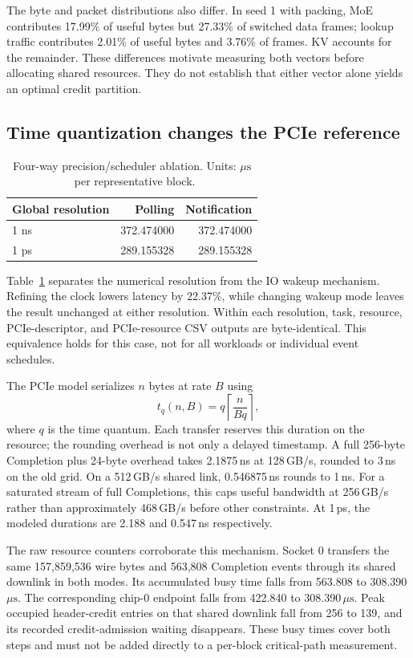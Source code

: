 \documentclass[conference]{IEEEtran}
\newcommand{\us}{\ensuremath{\mu\mathrm{s}}}
\begin{document}
The byte and packet distributions also differ. In seed 1 with packing, MoE contributes 17.99\% of useful bytes but 27.33\% of switched data frames; lookup traffic contributes 2.01\% of useful bytes and 3.76\% of frames. KV accounts for the remainder. These differences motivate measuring both vectors before allocating shared resources. They do not establish that either vector alone yields an optimal credit partition.

\subsection{Time quantization changes the PCIe reference}
\begin{table}[t]
\centering\caption{Four-way precision/scheduler ablation. Units: \us\ per representative block.}
\label{tab:precision}
\begin{tabular}{lrr}\toprule
Global resolution & Polling & Notification\\\midrule
1 ns & 372.474000 & 372.474000\\
1 ps & 289.155328 & 289.155328\\\bottomrule
\end{tabular}
\end{table}

Table~\ref{tab:precision} separates the numerical resolution from the IO wakeup mechanism. Refining the clock lowers latency by 22.37\%, while changing wakeup mode leaves the result unchanged at either resolution. Within each resolution, task, resource, PCIe-descriptor, and PCIe-resource CSV outputs are byte-identical. This equivalence holds for this case, not for all workloads or individual event schedules.

The PCIe model serializes $n$ bytes at rate $B$ using
\begin{equation}
 t_q(n,B)=q\left\lceil\frac{n}{Bq}\right\rceil,
\end{equation}
where $q$ is the time quantum. Each transfer reserves this duration on the resource; the rounding overhead is not only a delayed timestamp. A full 256-byte Completion plus 24-byte overhead takes 2.1875\,ns at 128\,GB/s, rounded to 3\,ns on the old grid. On a 512\,GB/s shared link, 0.546875\,ns rounds to 1\,ns. For a saturated stream of full Completions, this caps useful bandwidth at 256\,GB/s rather than approximately 468\,GB/s before other constraints. At 1\,ps, the modeled durations are 2.188 and 0.547\,ns respectively.

The raw resource counters corroborate this mechanism. Socket 0 transfers the same 157,859,536 wire bytes and 563,808 Completion events through its shared downlink in both modes. Its accumulated busy time falls from 563.808 to 308.390\,\us. The corresponding chip-0 endpoint falls from 422.840 to 308.390\,\us. Peak occupied header-credit entries on that shared downlink fall from 256 to 139, and its recorded credit-admission waiting disappears. These busy times cover both steps and must not be added directly to a per-block critical-path measurement.
\end{document}
